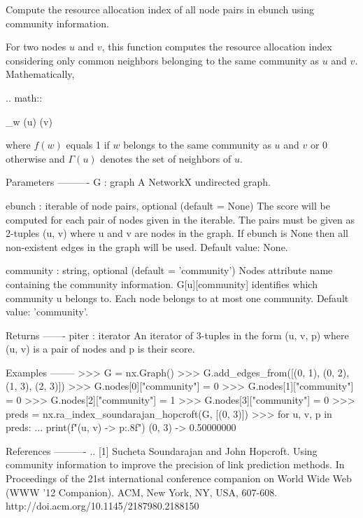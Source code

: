 \begin{DoxyVerb}Compute the resource allocation index of all node pairs in
ebunch using community information.

For two nodes $u$ and $v$, this function computes the resource
allocation index considering only common neighbors belonging to the
same community as $u$ and $v$. Mathematically,

.. math::

    \sum_{w \in \Gamma(u) \cap \Gamma(v)} 

where $f(w)$ equals 1 if $w$ belongs to the same community as $u$
and $v$ or 0 otherwise and $\Gamma(u)$ denotes the set of
neighbors of $u$.

Parameters
----------
G : graph
    A NetworkX undirected graph.

ebunch : iterable of node pairs, optional (default = None)
    The score will be computed for each pair of nodes given in the
    iterable. The pairs must be given as 2-tuples (u, v) where u
    and v are nodes in the graph. If ebunch is None then all
    non-existent edges in the graph will be used.
    Default value: None.

community : string, optional (default = 'community')
    Nodes attribute name containing the community information.
    G[u][community] identifies which community u belongs to. Each
    node belongs to at most one community. Default value: 'community'.

Returns
-------
piter : iterator
    An iterator of 3-tuples in the form (u, v, p) where (u, v) is a
    pair of nodes and p is their score.

Examples
--------
>>> G = nx.Graph()
>>> G.add_edges_from([(0, 1), (0, 2), (1, 3), (2, 3)])
>>> G.nodes[0]["community"] = 0
>>> G.nodes[1]["community"] = 0
>>> G.nodes[2]["community"] = 1
>>> G.nodes[3]["community"] = 0
>>> preds = nx.ra_index_soundarajan_hopcroft(G, [(0, 3)])
>>> for u, v, p in preds:
...     print(f"({u}, {v}) -> {p:.8f}")
(0, 3) -> 0.50000000

References
----------
.. [1] Sucheta Soundarajan and John Hopcroft.
   Using community information to improve the precision of link
   prediction methods.
   In Proceedings of the 21st international conference companion on
   World Wide Web (WWW '12 Companion). ACM, New York, NY, USA, 607-608.
   http://doi.acm.org/10.1145/2187980.2188150
\end{DoxyVerb}
 \mbox{\label{namespacenetworkx_1_1algorithms_1_1link__prediction_a2d04b0b73763f8f964ae0d251e536b31}} 
